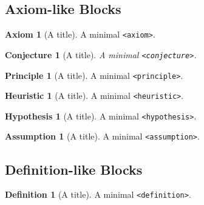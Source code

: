 \documentclass{amsart}
\theoremstyle{plain}%
\newtheorem{conjecture}[theorem]{Conjecture}
\theoremstyle{definition}%
\newtheorem{definition}[theorem]{Definition}
\newtheorem{axiom}[theorem]{Axiom}
\newtheorem{principle}[theorem]{Principle}
\newtheorem{heuristic}[theorem]{Heuristic}
\newtheorem{hypothesis}[theorem]{Hypothesis}
\newtheorem{assumption}[theorem]{Assumption}
\theoremstyle{remark}%
\newcommand{\mono}[1]{\texttt{#1}}
\numberwithin{equation}{section}
\begin{document}
\subsection{Axiom-like Blocks}\label{block-samples-axiom-like}%
\begin{axiom}[A title]\label{block-samples-axiom-like-2}%
%
A minimal \mono{<axiom>}.%
\end{axiom}
\begin{conjecture}[A title]\label{block-samples-axiom-like-3}%
%
A minimal \mono{<conjecture>}.%
\end{conjecture}
\begin{principle}[A title]\label{block-samples-axiom-like-4}%
%
A minimal \mono{<principle>}.%
\end{principle}
\begin{heuristic}[A title]\label{block-samples-axiom-like-5}%
%
A minimal \mono{<heuristic>}.%
\end{heuristic}
\begin{hypothesis}[A title]\label{block-samples-axiom-like-6}%
%
A minimal \mono{<hypothesis>}.%
\end{hypothesis}
\begin{assumption}[A title]\label{block-samples-axiom-like-7}%
%
A minimal \mono{<assumption>}.%
\end{assumption}
%
%
\typeout{************************************************}
\typeout{************************************************}
%
\subsection{Definition-like Blocks}\label{block-samples-definition-like}%
\begin{definition}[A title]\label{block-samples-definition-like-2}%
%
A minimal \mono{<definition>}.%
\end{definition}
%
%
\typeout{************************************************}
\typeout{************************************************}
%
\end{document}
